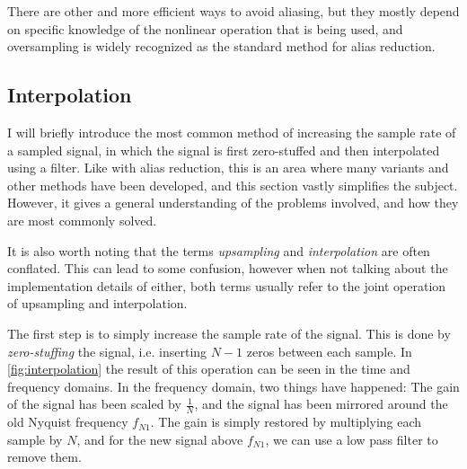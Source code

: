 There are other and more efficient ways to avoid aliasing\autocite{7865908}, but they mostly depend on
specific knowledge of the nonlinear operation that is being used, and oversampling is widely recognized as
the standard method for alias reduction\autocite{kahles2019oversampling, deman2014}.

\subsection{Interpolation}

I will briefly introduce the most common method of increasing the sample rate of a sampled signal, in which
the signal is first zero-stuffed and then interpolated using a filter. Like with alias reduction, this is an
area where many variants and other methods have been developed\autocite{SORIA2013, castillocomparative}, and this section vastly
simplifies the subject. However, it gives a general understanding of the problems involved, and how they are
most commonly solved.

It is also worth noting that the terms \emph{upsampling} and \emph{interpolation} are often conflated.
This can lead to some confusion, however when not talking about the implementation details of either, both
terms usually refer to the joint operation of upsampling and interpolation.

The first step is to simply increase the sample rate of the signal. This is done by \emph{zero-stuffing}
the signal, i.e. inserting $N - 1$ zeros between each sample. In \autoref{fig:interpolation} the
result of this operation can be seen in the time and frequency domains. In the frequency domain, two things
have happened: The gain of the signal has been scaled by $\frac{1}{N}$, and the signal has been
mirrored around the old Nyquist frequency $f_{N1}$. The gain is simply restored by multiplying
each sample by $N$, and for the new signal above $f_{N1}$, we can use a low
pass filter to remove them.

